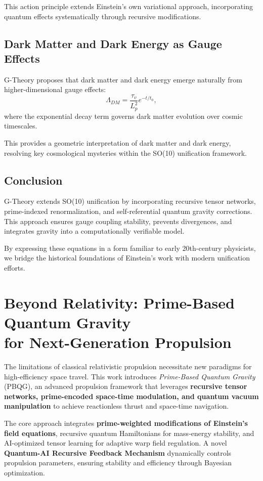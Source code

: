 \documentclass{article}
\theoremstyle{plain}
\begin{document}
This action principle extends Einstein’s own variational approach, incorporating quantum effects systematically through recursive modifications.

\subsection{Dark Matter and Dark Energy as Gauge Effects}
G-Theory proposes that dark matter and dark energy emerge naturally from higher-dimensional gauge effects:
\begin{equation}
    \Lambda_{DM} = \frac{\tau_v}{L_p^2} e^{-t/t_0},
\end{equation}
where the exponential decay term governs dark matter evolution over cosmic timescales.

This provides a geometric interpretation of dark matter and dark energy, resolving key cosmological mysteries within the SO(10) unification framework.

\subsection{Conclusion}
G-Theory extends SO(10) unification by incorporating recursive tensor networks, prime-indexed renormalization, and self-referential quantum gravity corrections. This approach ensures gauge coupling stability, prevents divergences, and integrates gravity into a computationally verifiable model.

By expressing these equations in a form familiar to early 20th-century physicists, we bridge the historical foundations of Einstein’s work with modern unification efforts.

\section{Beyond Relativity: Prime-Based Quantum Gravity \\ for Next-Generation Propulsion}

The limitations of classical relativistic propulsion necessitate new paradigms for high-efficiency space travel. This work introduces \textit{Prime-Based Quantum Gravity} (PBQG), an advanced propulsion framework that leverages \textbf{recursive tensor networks, prime-encoded space-time modulation, and quantum vacuum manipulation} to achieve reactionless thrust and space-time navigation.

The core approach integrates \textbf{prime-weighted modifications of Einstein’s field equations}, recursive quantum Hamiltonians for mass-energy stability, and AI-optimized tensor learning for adaptive warp field regulation. A novel \textbf{Quantum-AI Recursive Feedback Mechanism} dynamically controls propulsion parameters, ensuring stability and efficiency through Bayesian optimization.
\end{document}

